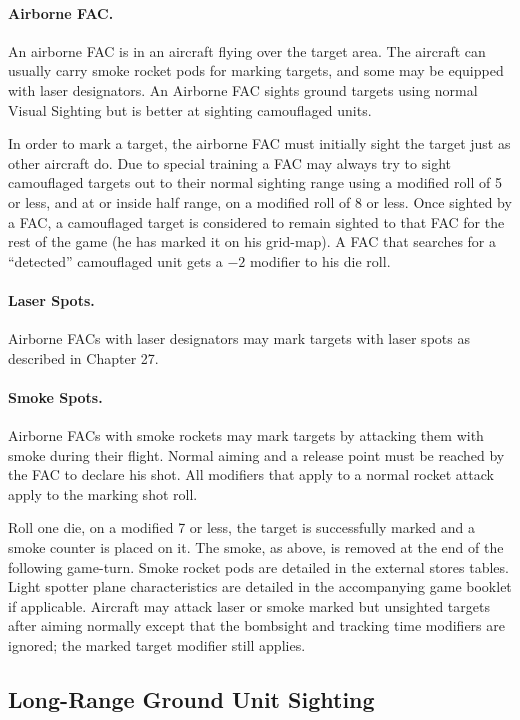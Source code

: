 \paragraph{Airborne FAC.} An airborne FAC is in an aircraft flying over the target area. The aircraft can usually carry smoke rocket pods for marking targets, and some may be equipped with laser designators. An Airborne FAC sights ground targets using normal Visual Sighting but is better at sighting camouflaged units.

In order to mark a target, the airborne FAC must initially sight the target just as other aircraft do. Due to special training a FAC may always try to sight camouflaged targets out to their normal sighting range using a modified roll of 5 or less, and at or inside half range, on a modified roll of 8 or less. Once sighted by a FAC, a camouflaged target is considered to remain sighted to that FAC for the rest of the game (he has marked it on his grid-map). A FAC that searches for a “detected” camouflaged unit gets a $-2$ modifier to his die roll.

\paragraph{Laser Spots.} Airborne FACs with laser designators may mark targets with laser spots as described in Chapter 27.

\paragraph{Smoke Spots.} Airborne FACs with smoke rockets may mark targets by attacking them with smoke during their flight. Normal aiming and a release point must be reached by the FAC to declare his shot. All modifiers that apply to a normal rocket attack apply to the marking shot roll.

Roll one die, on a modified 7 or less, the target is successfully marked and a smoke counter is placed on it. The smoke, as above, is removed at the end of the following game-turn. Smoke rocket pods are detailed in the external stores tables. Light spotter plane characteristics are detailed in the accompanying game booklet if applicable. Aircraft may attack laser or smoke marked but unsighted targets after aiming normally except that the bombsight and tracking time modifiers are ignored; the marked target modifier still applies.

\subsection{Long-Range Ground Unit Sighting}

